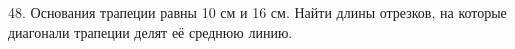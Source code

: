 48. Основания трапеции равны 10 см и 16 см. Найти длины отрезков, на которые диагонали трапеции делят её среднюю линию.\\
